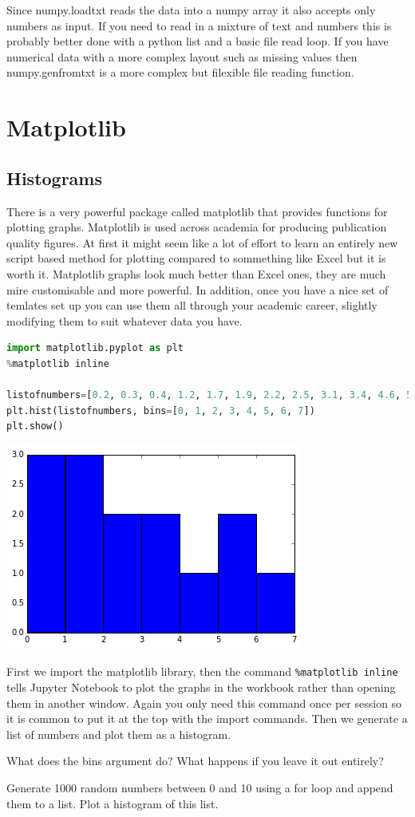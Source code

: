 Since numpy.loadtxt reads the data into a numpy array it also accepts only numbers as input. If you need to read in a mixture of text and numbers this is probably better done with a python list and a basic file read loop. If you have numerical data with a more complex layout such as missing values then numpy.genfromtxt is a more complex but filexible file reading function.



\section{Matplotlib}
	\subsection{Histograms}
		There is a very powerful package called matplotlib that provides functions for plotting graphs. Matplotlib is used across academia for producing publication quality figures. At first it might seem like a lot of effort to learn an entirely new script based method for plotting compared to sommething like Excel but it is worth it. Matplotlib graphs look much better than Excel ones, they are much mire customisable and more powerful. In addition, once you have a nice set of temlates set up you can use them all through your academic career, slightly modifying them to suit whatever data you have.
		\begin{lstlisting}[language=Python]
import matplotlib.pyplot as plt
%matplotlib inline

listofnumbers=[0.2, 0.3, 0.4, 1.2, 1.7, 1.9, 2.2, 2.5, 3.1, 3.4, 4.6, 5.1, 5.6, 6.0, 7.4, 7.4, 7.6]
plt.hist(listofnumbers, bins=[0, 1, 2, 3, 4, 5, 6, 7])
plt.show()\end{lstlisting}
		\includegraphics[scale=0.8]{images/histogram}

		First we import the matplotlib library, then the command \texttt{\%matplotlib inline} tells Jupyter Notebook to plot the graphs in the workbook rather than opening them in another window. Again you only need this command once per session so it is common to put it at the top with the import commands. Then we generate a list of numbers and plot them as a histogram.
		\begin{task}What does the bins argument do? What happens if you leave it out entirely?\end{task}
		\begin{task}Generate 1000 random numbers between 0 and 10 using a for loop and append them to a list. Plot a histogram of this list.\end{task}

